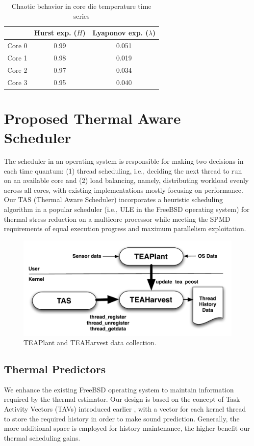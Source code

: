 \documentclass[times, 10pt,twocolumn]{IEEEtran}
\begin{document}
\begin{table}[tbhp]
\caption{Chaotic behavior in core die temperature time series}
\label{tab:chaotic} 
\centering 
\begin{tabular}{lcc}
\hline
\hline
 & Hurst exp. ($H$) & Lyaponov exp. ($\lambda$) \\
\hline
Core 0 & 0.99 & 0.051 \\
Core 1 & 0.98 & 0.019 \\
Core 2 & 0.97 & 0.034 \\
Core 3 & 0.95 & 0.040 \\
\hline
\end{tabular}
\end{table}

\section{Proposed Thermal Aware Scheduler}
\label{sec:sdesign} 
The scheduler in an operating system is responsible for making two
decisions in each time quantum: (1) thread scheduling, i.e., deciding
the next thread to run on an available core and (2) load balancing,
namely, distributing workload evenly across all cores, with existing
implementations mostly focusing on performance.  Our TAS (Thermal Aware
Scheduler) incorporates a heuristic scheduling algorithm in a popular
scheduler (i.e., ULE in the FreeBSD operating system) for thermal stress
reduction on a multicore processor while meeting the SPMD requirements
of equal execution progress and maximum parallelism exploitation.

\begin{figure}[t] \centering
  \includegraphics[scale=0.45]{tasdesign}
  \caption{TEAPlant and TEAHarvest data collection.}
  \label{fig:teaplant}
\end{figure}

\subsection{Thermal Predictors}
\label{sec:therm-pred-design} 
We enhance the existing FreeBSD operating system to maintain information
required by the thermal estimator. Our design is based on the concept of
Task Activity Vectors (TAVs) introduced earlier \cite{Merkel2008a},
with a vector for each kernel thread to store the required history in order to make
sound prediction.  Generally, the more additional space is employed
for history maintenance, the higher benefit our thermal scheduling gains.
\end{document}
